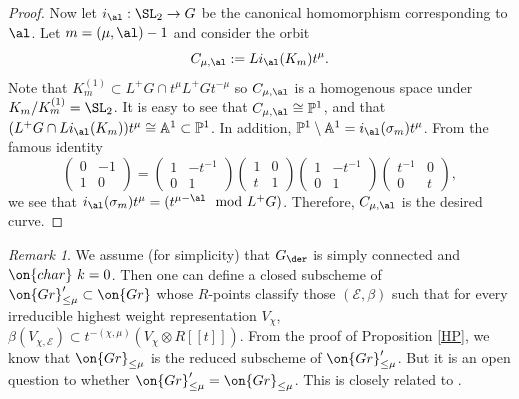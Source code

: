 \documentclass[]{pcmi}
\theoremstyle{plain}
\theoremstyle{remark}
\newtheorem{rmk}[equation]{Remark}
\theoremstyle{definition}
\newcommand{\bA}{{\mathbb A}}
\newcommand{\bP}{{\mathbb P}}
\newcommand{\mE}{{\mathcal E}}
\newcommand{\cha}{{\on{char}}}
\newcommand{\Gr}{{\on{Gr}}}
\begin{document}
\begin{proof}
Now let $i_\al: \SL_2\to G$ be the canonical homomorphism corresponding to $\al$. Let $m=(\mu,\al)-1$ and consider the orbit 
\begin{equation}\label{curve C}
C_{\mu,\al}:=Li_\al(K_{m})t^\mu.
\end{equation} 
Note that $K_{m}^{(1)}\subset L^+G\cap t^\mu L^+G t^{-\mu}$ so $C_{\mu,\al}$ is a homogenous space under $K_{m}/K_m^{(1)}=\SL_2$. It is easy to see that $C_{\mu,\al}\cong \bP^1$, and that $(L^+G\cap Li_\al(K_m))t^\mu\cong \bA^1\subset \bP^1$. In addition, $\bP^1\setminus\bA^1=i_\al(\sigma_m)t^\mu$.
From the famous identity
\[\begin{pmatrix}0&-1\\1&0\end{pmatrix}=\begin{pmatrix}1&-t^{-1}\\0&1\end{pmatrix}\begin{pmatrix}1&0\\ t&1\end{pmatrix}\begin{pmatrix}1&-t^{-1}\\0&1\end{pmatrix}\begin{pmatrix}t^{-1}&0\\0&t\end{pmatrix},\]
we see that $i_{\al}(\sigma_m)t^\mu=(t^{\mu-\al} \mod L^+G)$. Therefore, $C_{\mu,\al}$ is the desired curve.
\end{proof}


\begin{rmk}We assume (for simplicity) that $G_\der$ is simply connected and $\cha\ k=0$. Then one can define a closed subscheme of $\Gr'_{\leq \mu}\subset \Gr$ whose $R$-points classify those $(\mE,\beta)$ such that for every irreducible highest weight representation $V_\chi$, $\beta(V_{\chi,\mE})\subset t^{-(\chi,\mu)}(V_{\chi}\otimes R[[t]])$. From the proof of Proposition \ref{HP}, we know that $\Gr_{\leq \mu}$ is the reduced subscheme of $\Gr'_{\leq \mu}$. But it is an open question to whether $\Gr'_{\leq \mu}=\Gr_{\leq \mu}$. This is closely related to \cite[Conjecture 2.14, Conjecture 2.20]{KWWY}. 
\end{rmk}
\end{document}
